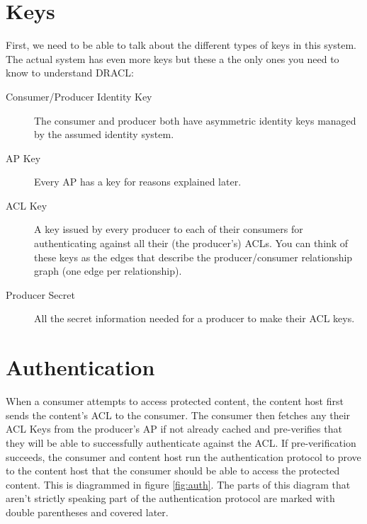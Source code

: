 \documentclass[pdftex,12pt,a4papaer,twoside,notitlepage]{report}
\begin{document}
\section{Keys}
\label{sec:keys}

First, we need to be able to talk about the different types of keys in this
system. The actual system has even more keys but these a the only ones you need
to know to understand DRACL:

\begin{description}
\item[Consumer/Producer Identity Key] The consumer and producer both have
  asymmetric identity keys managed by the assumed identity system.
\item[AP Key] Every AP has a key for reasons explained later.
\item[ACL Key] A key issued by every producer to each of their consumers for
  authenticating against all their (the producer's) ACLs. You can think of these
  keys as the edges that describe the producer/consumer relationship graph (one
  edge per relationship).
\item[Producer Secret] All the secret information needed for a producer to make
  their ACL keys.
\end{description}

\section{Authentication}
\label{sec:authentication}

When a consumer attempts to access protected content, the content host first
sends the content's ACL to the consumer. The consumer then fetches any their ACL
Keys from the producer's AP if not already cached and pre-verifies that they
will be able to successfully authenticate against the ACL. If pre-verification
succeeds, the consumer and content host run the authentication protocol to prove
to the content host that the consumer should be able to access the protected
content. This is diagrammed in figure \cref{fig:auth}. The parts of this diagram
that aren't strictly speaking part of the authentication protocol are marked
with double parentheses and covered later.
\end{document}
